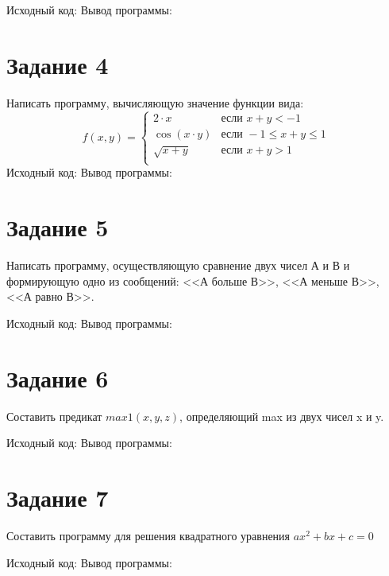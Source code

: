 \documentclass[a4paper,14pt]{article}
\begin{document}
    Исходный код:
    {\small {}}
    Вывод программы:
    {\small {}}


    \section*{Задание 4}

    Написать программу, вычисляющую значение функции вида:
    \[
        f(x,y)=
        \begin{cases}
            2 \cdot x& \text{если } x+y < -1\\
            \cos(x \cdot y) &\text{если } -1 \le x+y \le 1\\
            \sqrt{x + y} &\text{если } x+y > 1\\
        \end{cases}
    \]
    Исходный код:
    {\small {}}
    Вывод программы:
    {\small {}}


    \section*{Задание 5}

    Написать программу, осуществляющую сравнение двух чисел А и В и формирующую одно из сообщений:
    <<А больше В>>, <<А меньше В>>, <<А равно В>>.

    Исходный код:
    {\small {}}
    Вывод программы:
    {\small {}}


    \section*{Задание 6}

    Составить предикат  $max1(x,y,z)$, определяющий max из двух чисел x и y.


    Исходный код:
    {\small {}}
    Вывод программы:
    {\small {}}


    \section*{Задание 7}

    Составить программу для решения квадратного уравнения  $ax^2+bx+c=0 $

    Исходный код:
    {\small {}}
    Вывод программы:
    {\small {}}
\end{document}
